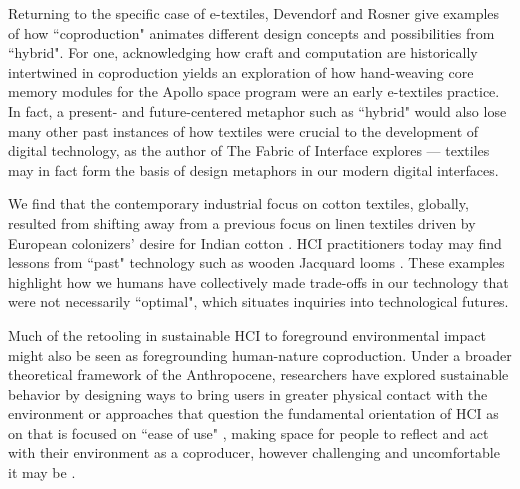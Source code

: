 Returning to the specific case of e-textiles, Devendorf and Rosner give examples of how ``coproduction" animates different design concepts and possibilities from ``hybrid". For one, acknowledging how craft and computation are historically intertwined in coproduction yields an exploration of how hand-weaving core memory modules for the Apollo space program were an early e-textiles practice. In fact, a present- and future-centered metaphor such as ``hybrid" would also lose many other past instances of how textiles were crucial to the development of digital technology, as the author of The Fabric of Interface \cite{monteiro_fabric_2017} explores --- textiles may in fact form the basis of design metaphors in our modern digital interfaces. 

 We find that the contemporary industrial focus on cotton textiles, globally, resulted from shifting away from a previous focus on linen textiles driven by European colonizers' desire for Indian cotton \cite{beckert_empire_2015,thompson_cotton_1922}. HCI practitioners today may find lessons from ``past" technology such as wooden Jacquard looms \cite{fernaeus_revisiting_2012}. These examples highlight how we humans have collectively made trade-offs in our technology that were not necessarily ``optimal", which situates inquiries into technological futures.

Much of the retooling in sustainable HCI to foreground environmental impact might also be seen as foregrounding human-nature coproduction. Under a broader theoretical framework of the Anthropocene, researchers have explored sustainable behavior by designing ways to bring users in greater physical contact with the environment \cite{kuznetsov_nurturing_2011,liu_design_2018,light_design_2017} or approaches that question the fundamental orientation of HCI as on that is focused on ``ease of use" \cite{light_design_2017}, making space for people to reflect and act with their environment as a coproducer, however challenging and uncomfortable it may be \cite{dew_lessons_2018,lewis_making_2018,liu_decomposition_2019}. 

